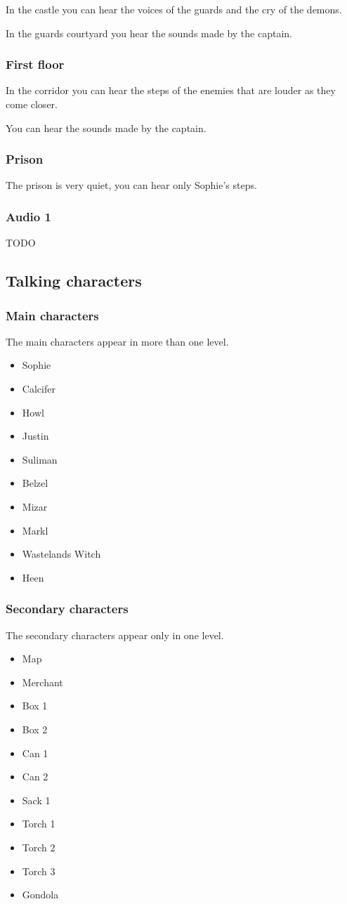 In the castle you can hear the voices of the guards and the cry of the demons.

In the guards courtyard you hear the sounds made by the captain.

\subsubsection*{First floor}
In the corridor you can hear the steps of the enemies that are louder as they come closer.

You can hear the sounds made by the captain.

\subsubsection*{Prison}
The prison is very quiet, you can hear only Sophie's steps.

\subsubsection*{Audio 1}
TODO

\subsection{Talking characters}

\subsubsection*{Main characters}
The main characters appear in more than one level.
\begin{itemize}
	\item Sophie
	\item Calcifer
	\item Howl
	\item Justin
	\item Suliman
	\item Belzel
	\item Mizar
	\item Markl
	\item Wastelands Witch
	\item Heen
\end{itemize}

\subsubsection*{Secondary characters}
The secondary characters appear only in one level.
\begin{itemize}
	\item Map
	\item Merchant
	\item Box 1
	\item Box 2
	\item Can 1
	\item Can 2
	\item Sack 1
	\item Torch 1
	\item Torch 2
	\item Torch 3
	\item Gondola
\end{itemize}

